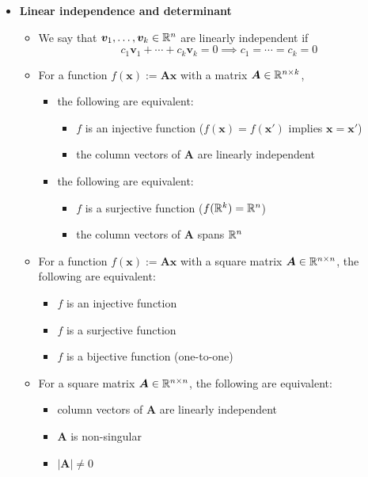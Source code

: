 \documentclass[12pt,a4paper]{article}
\begin{document}
\begin{itemize}
\item \textbf{Linear independence and determinant}
  \begin{itemize}
  \item We say that $\bm{v}_{1}, \ldots, \bm{v}_{k}\in \mathbb{R}^{n}$ are linearly independent if
    \begin{equation}\nonumber%
      c_{1}\bm{v}_{1} + \cdots + c_{k}\bm{v}_{k} = 0
      \implies
      c_{1} = \cdots = c_{k} = 0
    \end{equation}
  \item For a function $f(\bm{x}):=\bm{A}\bm{x}$ with a matrix $\bm{A}\in\mathbb{R}^{n\times k}$,    
    \begin{itemize}
    \item the following are equivalent:
      \begin{itemize}
      \item $f$ is an injective function ($f(\bm{x})= f(\bm{x}')$ implies $\bm{x}=\bm{x}'$)
      \item the column vectors of $\bm{A}$ are linearly independent
      \end{itemize}
    \item the following are equivalent:
      \begin{itemize}
      \item $f$ is a surjective function ($f(\mathbb{R}^{k})= \mathbb{R}^{n}$)
      \item the column vectors of $\bm{A}$ spans $\mathbb{R}^{n}$
      \end{itemize}
    \end{itemize}
  \item For a function $f(\bm{x}):=\bm{A}\bm{x}$ with a square matrix $\bm{A}\in\mathbb{R}^{n\times n}$,
    the following are equivalent:
    \begin{itemize}
    \item $f$ is an injective function
    \item $f$ is a surjective function
    \item $f$ is a bijective function (one-to-one)
    \end{itemize}
  \item For a square matrix $\bm{A}\in\mathbb{R}^{n\times n}$,
    the following are equivalent:
    \begin{itemize}
    \item column vectors of $\bm{A}$ are linearly independent
    \item $\bm{A}$ is non-singular
    \item $|\bm{A}|\neq 0$
    \end{itemize}
  \end{itemize}


\end{itemize}
\end{document}
